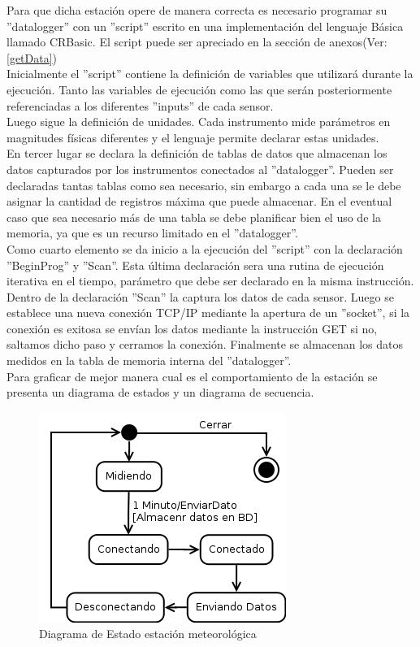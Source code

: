 \newpage
Para que dicha estación opere de manera correcta es necesario programar su ''datalogger'' con un ''script'' escrito en una implementación del lenguaje Básica llamado CRBasic. El script puede ser apreciado en la sección de anexos(Ver: \ref{getData})\\

Inicialmente el ''script'' contiene la definición de variables que utilizará durante la ejecución. Tanto las variables de ejecución como las que serán posteriormente referenciadas a los diferentes ''inputs'' de cada sensor.\\

Luego sigue la definición de unidades. Cada instrumento mide parámetros en magnitudes físicas diferentes y el lenguaje permite declarar estas unidades.\\

En tercer lugar se declara la definición de tablas de datos que almacenan los datos capturados por los instrumentos conectados al ''datalogger''. Pueden ser declaradas tantas tablas como sea necesario, sin embargo a cada una se le debe asignar la cantidad de registros máxima que puede almacenar. En el eventual caso que sea necesario más de una tabla se debe planificar bien el uso de la memoria, ya que es un recurso limitado en el ''datalogger''.\\

Como cuarto elemento se da inicio a la ejecución del ''script'' con la declaración ''BeginProg'' y ''Scan''. Esta última declaración sera una rutina de ejecución iterativa en el tiempo, parámetro que debe ser declarado en la misma instrucción.\\

Dentro de la declaración ''Scan'' la captura los datos de cada sensor. Luego se establece una nueva conexión TCP/IP mediante la apertura de un ''socket'', si la conexión es exitosa se envían los datos mediante la instrucción GET si no, saltamos dicho paso y cerramos la conexión. Finalmente se almacenan los datos medidos en la tabla de memoria interna del ''datalogger''.\\

Para graficar de mejor manera cual es el comportamiento de la estación se presenta un diagrama de estados y un diagrama de secuencia.

\begin{figure}[h!]
        \centering
        \includegraphics[scale=0.4]{images/estacionEstados}
        \caption{Diagrama de Estado estación meteorológica}
        \label{estacionEstados}
\end{figure}

